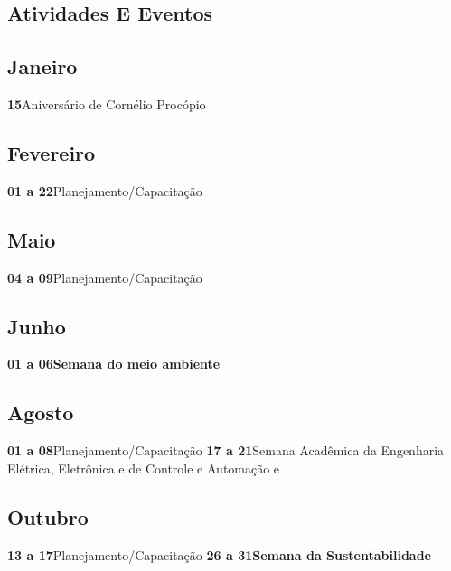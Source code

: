 \documentclass[thesis]{hmcposter}
\begin{document}
\begin{poster}
\normalsize \section{\color{hmcorange}Atividades E Eventos}\subsection{Janeiro}\textbf{15}\quad \quad \quad \quad Aniversário de Cornélio Procópio \newline\subsection{Fevereiro}\textbf{01 a 22}\quad \quad Planejamento/Capacitação \newline\subsection{Maio}\textbf{04 a 09}\quad \quad Planejamento/Capacitação \newline\subsection{Junho}\textbf{01 a 06}\quad \quad \textbf{Semana do meio ambiente} \newline\subsection{Agosto}\textbf{01 a 08}\quad \quad Planejamento/Capacitação \newline\textbf{17 a 21}\quad \quad Semana Acadêmica da Engenharia Elétrica, Eletrônica e de Controle e Automação e  \newline\subsection{Outubro}\textbf{13 a 17}\quad \quad Planejamento/Capacitação \newline\textbf{26 a 31}\quad \quad \textbf{Semana da Sustentabilidade} \newline\end{poster}
\end{document}
